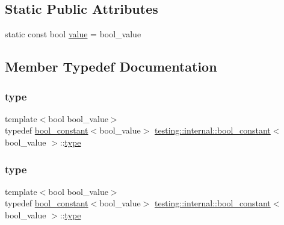 \subsection*{Static Public Attributes}
\begin{DoxyCompactItemize}
\item 
static const bool \mbox{\hyperlink{structtesting_1_1internal_1_1bool__constant_a499fba6576296b04d99690a486424b32}{value}} = bool\+\_\+value
\end{DoxyCompactItemize}


\subsection{Member Typedef Documentation}
\mbox{\label{structtesting_1_1internal_1_1bool__constant_aba6d09ecf7eecea6c93480f0d627a167}} 
\subsubsection{\texorpdfstring{type}{type}\hspace{0.1cm}{\footnotesize\ttfamily [1/3]}}
{\footnotesize\ttfamily template$<$bool bool\+\_\+value$>$ \\
typedef \mbox{\hyperlink{structtesting_1_1internal_1_1bool__constant}{bool\+\_\+constant}}$<$bool\+\_\+value$>$ \mbox{\hyperlink{structtesting_1_1internal_1_1bool__constant}{testing\+::internal\+::bool\+\_\+constant}}$<$ bool\+\_\+value $>$\+::\mbox{\hyperlink{structtesting_1_1internal_1_1bool__constant_aba6d09ecf7eecea6c93480f0d627a167}{type}}}

\mbox{\label{structtesting_1_1internal_1_1bool__constant_aba6d09ecf7eecea6c93480f0d627a167}} 
\subsubsection{\texorpdfstring{type}{type}\hspace{0.1cm}{\footnotesize\ttfamily [2/3]}}
{\footnotesize\ttfamily template$<$bool bool\+\_\+value$>$ \\
typedef \mbox{\hyperlink{structtesting_1_1internal_1_1bool__constant}{bool\+\_\+constant}}$<$bool\+\_\+value$>$ \mbox{\hyperlink{structtesting_1_1internal_1_1bool__constant}{testing\+::internal\+::bool\+\_\+constant}}$<$ bool\+\_\+value $>$\+::\mbox{\hyperlink{structtesting_1_1internal_1_1bool__constant_aba6d09ecf7eecea6c93480f0d627a167}{type}}}

